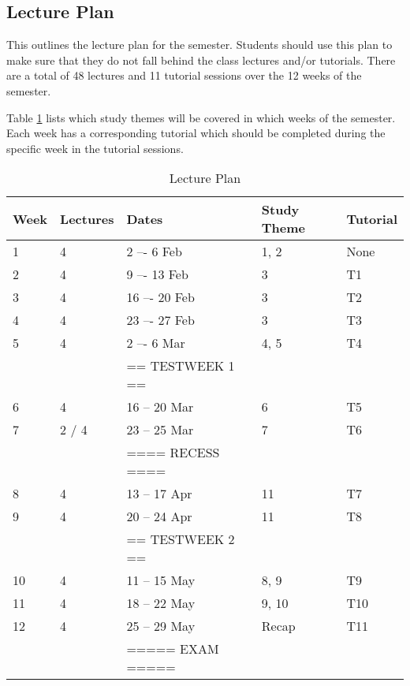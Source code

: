     \subsection{Lecture Plan}
        This outlines the lecture plan for the semester. Students should use
        this plan to make sure that they do not fall behind the class
        lectures and/or tutorials. There are a total of 48 lectures and 11
        tutorial sessions over the 12 weeks of the semester.

        Table \ref{tab:lec_plan} lists which study themes will be covered
        in which weeks of the semester. Each week has a corresponding tutorial
        which should be completed during the specific week in the tutorial
        sessions.

        \begin{table}[!h]
            \begin{center}
             \begin{tabular}{|l|l|l|l|l|}
                 \hline
                 {\bf Week} & {\bf Lectures} & {\bf Dates} & %
                 {\bf Study Theme} & {\bf Tutorial} \\
                 \hline
                 1  & 4     &  2 –-  6 Feb     & 1, 2  & None \\
                 2  & 4     &  9 –- 13 Feb     & 3     & T1 \\
                 3  & 4     & 16 –- 20 Feb     & 3     & T2 \\
                 4  & 4     & 23 –- 27 Feb     & 3     & T3 \\
                 5  & 4     &  2 –-  6 Mar     & 4, 5  & T4 \\
                    &       & == TESTWEEK 1 == &       & \\
                 6  & 4     & 16 -- 20 Mar     & 6     & T5 \\
                 7  & 2 / 4 & 23 -- 25 Mar     & 7     & T6 \\
                    &       & ==== RECESS ==== &       & \\
                 8  & 4     & 13 -- 17 Apr     & 11    & T7 \\
                 9  & 4     & 20 -- 24 Apr     & 11    & T8 \\
                    &       & == TESTWEEK 2 == &       & \\
                 10 & 4     & 11 -- 15 May     & 8, 9  & T9 \\
                 11 & 4     & 18 -- 22 May     & 9, 10 & T10 \\
                 12 & 4     & 25 -- 29 May     & Recap & T11 \\
                    &       & ===== EXAM ===== &       & \\
                 \hline
             \end{tabular}
             \caption{Lecture Plan} \label{tab:lec_plan}
            \end{center}
        \end{table}

